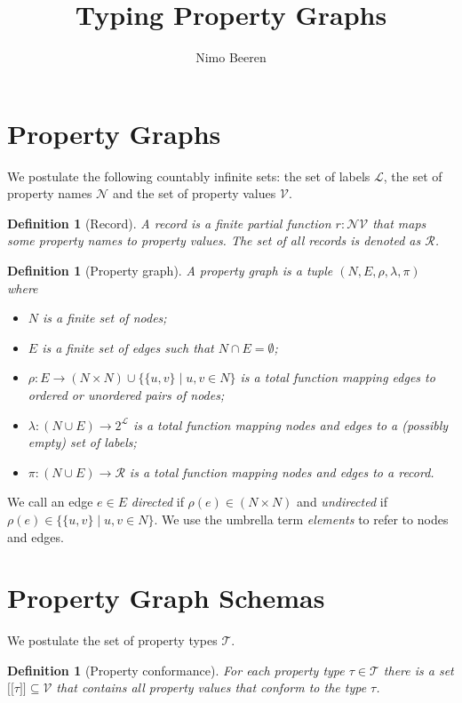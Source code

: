 \documentclass[a4paper]{article}
\title{Typing Property Graphs}
\author{Nimo Beeren}
\makeatletter
\newtheorem{definition}[theorem]{Definition}
\newcommand{\ptype}{\tau}
\newcommand{\ptypes}{\mathcal{T}}
\newcommand{\lsem}{\ensuremath{[\![}}
\newcommand{\rsem}{\ensuremath{]\!]}}
\newcommand{\sem}[1]{\ensuremath{\lsem #1 \rsem}}
\newcommand{\pto}{}%
\DeclareRobustCommand{\pto}{\mathrel{\mathpalette\p@to@gets\to}}
\newcommand{\p@to@gets}[2]{%
  \ooalign{\hidewidth$\m@th#1\mapstochar\mkern5mu$\hidewidth\cr$\m@th#1\to$\cr}%
}
\makeatother
\begin{document}
\section{Property Graphs}

We postulate the following countably infinite sets: the set of labels $\mathcal{L}$, the set of property names $\mathcal{N}$ and the set of property values $\mathcal{V}$.

\begin{definition}[Record]
  A \emph{record} is a finite partial function $r : \mathcal{N} \pto \mathcal{V}$ that maps some property names to property values. The set of all records is denoted as $\mathcal{R}$.
\end{definition}

\begin{definition}[Property graph]
  A \emph{property graph} is a tuple $(N, E, \rho, \lambda, \pi)$ where
  \begin{itemize}
    \item $N$ is a finite set of nodes;
    \item $E$ is a finite set of edges such that $N \cap E = \emptyset$;
    \item $\rho : E \to (N \times N) \cup \{\{u, v\} \mid u, v \in N\}$ is a total function mapping edges to ordered or unordered pairs of nodes;
    \item $\lambda : (N \cup E) \to 2^{\mathcal{L}}$ is a total function mapping nodes and edges to a (possibly empty) set of labels;
    \item $\pi : (N \cup E) \to \mathcal{R}$ is a total function mapping nodes and edges to a record.
  \end{itemize}
\end{definition}

We call an edge $e \in E$ \emph{directed} if $\rho(e) \in (N \times N)$ and \emph{undirected} if $\rho(e) \in \{\{u, v\} \mid u, v \in N\}$. We use the umbrella term \emph{elements} to refer to nodes and edges.

\section{Property Graph Schemas}

We postulate the set of property types $\mathcal{T}$.

\begin{definition}[Property conformance]
  For each property type $\ptype \in \ptypes$ there is a set $\sem{\ptype} \subseteq \mathcal{V}$ that contains all property values that \emph{conform} to the type $\ptype$.
\end{definition}
\end{document}
